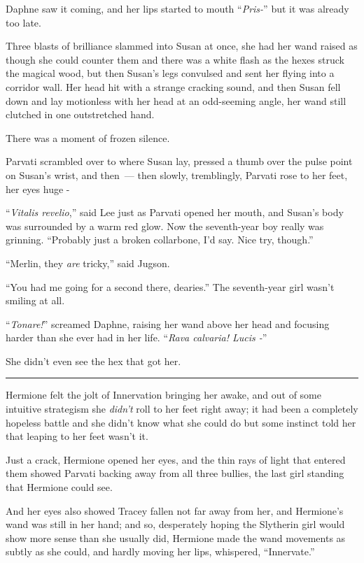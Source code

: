 Daphne saw it coming, and her lips started to mouth ``\emph{Pris-}'' but it was already too late.

Three blasts of brilliance slammed into Susan at once, she had her wand raised as though she could counter them and there was a white flash as the hexes struck the magical wood, but then Susan's legs convulsed and sent her flying into a corridor wall. Her head hit with a strange cracking sound, and then Susan fell down and lay motionless with her head at an odd-seeming angle, her wand still clutched in one outstretched hand.

There was a moment of frozen silence.

Parvati scrambled over to where Susan lay, pressed a thumb over the pulse point on Susan's wrist, and then~--- then slowly, tremblingly, Parvati rose to her feet, her eyes huge -

``\emph{Vitalis revelio},'' said Lee just as Parvati opened her mouth, and Susan's body was surrounded by a warm red glow. Now the seventh-year boy really was grinning. ``Probably just a broken collarbone, I'd say. Nice try, though.''

``Merlin, they \emph{are} tricky,'' said Jugson.

``You had me going for a second there, dearies.'' The seventh-year girl wasn't smiling at all.

``\emph{Tonare!}'' screamed Daphne, raising her wand above her head and focusing harder than she ever had in her life. ``\emph{Rava calvaria! Lucis -}''

She didn't even see the hex that got her.

\begin{center}\rule{3in}{0.4pt}\end{center}

Hermione felt the jolt of Innervation bringing her awake, and out of some intuitive strategism she \emph{didn't} roll to her feet right away; it had been a completely hopeless battle and she didn't know what she could do but some instinct told her that leaping to her feet wasn't it.

Just a crack, Hermione opened her eyes, and the thin rays of light that entered them showed Parvati backing away from all three bullies, the last girl standing that Hermione could see.

And her eyes also showed Tracey fallen not far away from her, and Hermione's wand was still in her hand; and so, desperately hoping the Slytherin girl would show more sense than she usually did, Hermione made the wand movements as subtly as she could, and hardly moving her lips, whispered, ``Innervate.''

